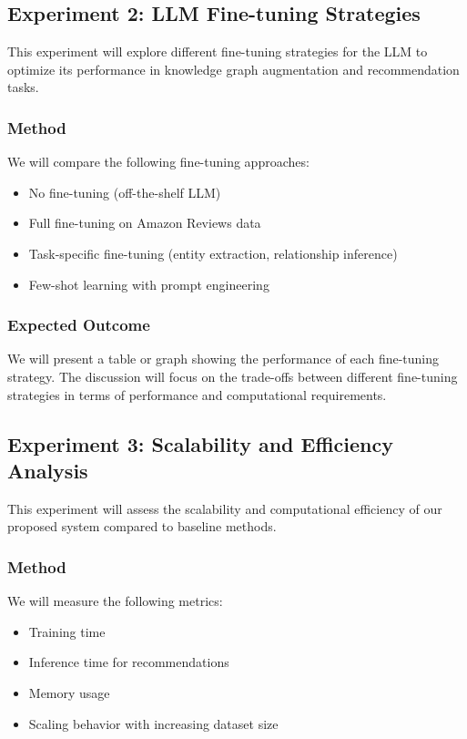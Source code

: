 \documentclass{article}
\begin{document}
\subsection{Experiment 2: LLM Fine-tuning Strategies}

This experiment will explore different fine-tuning strategies for the LLM to optimize its performance in knowledge graph augmentation and recommendation tasks.

\subsubsection{Method}
We will compare the following fine-tuning approaches:
\begin{itemize}
    \item No fine-tuning (off-the-shelf LLM)
    \item Full fine-tuning on Amazon Reviews data
    \item Task-specific fine-tuning (entity extraction, relationship inference)
    \item Few-shot learning with prompt engineering
\end{itemize}

\subsubsection{Expected Outcome}
We will present a table or graph showing the performance of each fine-tuning strategy. The discussion will focus on the trade-offs between different fine-tuning strategies in terms of performance and computational requirements.

\subsection{Experiment 3: Scalability and Efficiency Analysis}

This experiment will assess the scalability and computational efficiency of our proposed system compared to baseline methods.

\subsubsection{Method}
We will measure the following metrics:
\begin{itemize}
    \item Training time
    \item Inference time for recommendations
    \item Memory usage
    \item Scaling behavior with increasing dataset size
\end{itemize}
\end{document}
